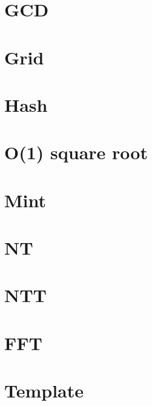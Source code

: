 \documentclass[10pt]{extarticle}
\begin{document}
\begin{multicols*}{3}
\section{GCD}


\section{Grid}


\section{Hash}


\section{O(1) square root}


\section{Mint}


\section{NT}


\section{NTT}


\section{FFT}


%

%

%

\section{Template}


\end{multicols*}
\end{document}
